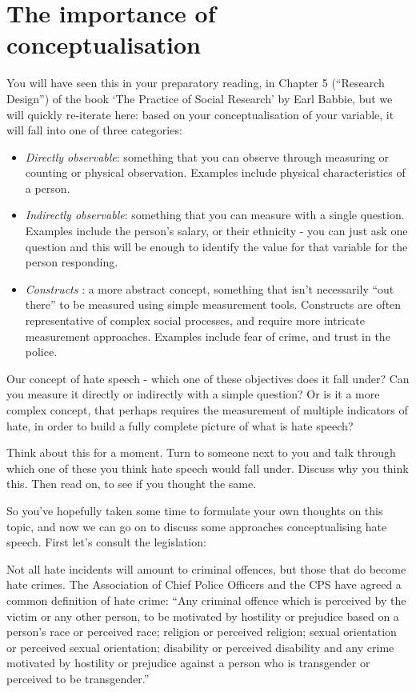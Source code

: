 \documentclass[
]{book}
\providecommand{\tightlist}{%
  \setlength{\itemsep}{0pt}\setlength{\parskip}{0pt}}
\begin{document}
\hypertarget{the-importance-of-conceptualisation}{%
\section{The importance of conceptualisation}\label{the-importance-of-conceptualisation}}

You will have seen this in your preparatory reading, in Chapter 5 (``Research Design'') of the book `The Practice of Social Research' by Earl Babbie, but we will quickly re-iterate here: based on your conceptualisation of your variable, it will fall into one of three categories:

\begin{itemize}
\tightlist
\item
  \emph{Directly observable}: something that you can observe through measuring or counting or physical observation. Examples include physical characteristics of a person.
\item
  \emph{Indirectly observable}: something that you can measure with a single question. Examples include the person's salary, or their ethnicity - you can just ask one question and this will be enough to identify the value for that variable for the person responding.
\item
  \emph{Constructs} : a more abstract concept, something that isn't necessarily ``out there'' to be measured using simple measurement tools. Constructs are often representative of complex social processes, and require more intricate measurement approaches. Examples include fear of crime, and trust in the police.
\end{itemize}

Our concept of hate speech - which one of these objectives does it fall under? Can you measure it directly or indirectly with a simple question? Or is it a more complex concept, that perhaps requires the measurement of multiple indicators of hate, in order to build a fully complete picture of what is hate speech?

Think about this for a moment. Turn to someone next to you and talk through which one of these you think hate speech would fall under. Discuss why you think this. Then read on, to see if you thought the same.

So you've hopefully taken some time to formulate your own thoughts on this topic, and now we can go on to discuss some approaches conceptualising hate speech. First let's consult the legislation:

Not all hate incidents will amount to criminal offences, but those that do become hate crimes. The Association of Chief Police Officers and the CPS have agreed a common definition of hate crime: ``Any criminal offence which is perceived by the victim or any other person, to be motivated by hostility or prejudice based on a person's race or perceived race; religion or perceived religion; sexual orientation or perceived sexual orientation; disability or perceived disability and any crime motivated by hostility or prejudice against a person who is transgender or perceived to be transgender.''
\end{document}
